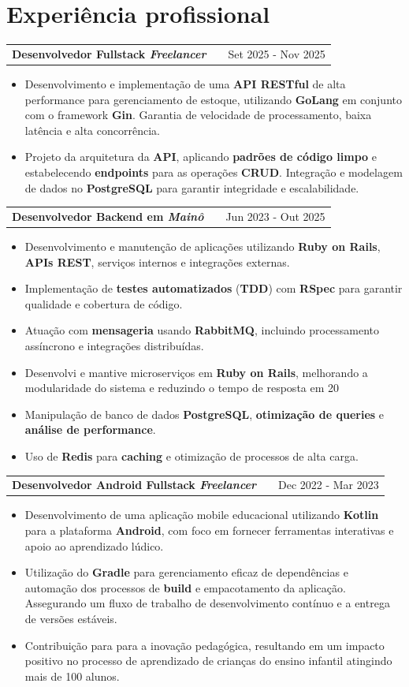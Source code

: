 \documentclass[a4paper,10.5pt]{article}
\makeatletter
\newenvironment{joblong}[2]
    {
    \begin{tabularx}{\linewidth}{@{}l X r@{}}
    \textbf{#1} & \hfill &  #2 \\[3.75pt]
    \end{tabularx}
    \begin{minipage}[t]{\linewidth}
    \begin{itemize}[nosep,after=\strut, leftmargin=1em, itemsep=3pt,label=--]
    }
    {
    \end{itemize}
    \end{minipage}    
    }
\makeatother
\begin{document}
\section{Experiência profissional}

\begin{joblong}{Desenvolvedor Fullstack \textit{Freelancer}}{Set 2025 - Nov 2025}
    \item Desenvolvimento e implementação de uma \textbf{API RESTful} de alta performance para gerenciamento de estoque, utilizando \textbf{GoLang} em conjunto com o framework \textbf{Gin}. Garantia de velocidade de processamento, baixa latência e alta concorrência.
    \item Projeto da arquitetura da \textbf{API}, aplicando \textbf{padrões de código limpo} e estabelecendo \textbf{endpoints} para as operações \textbf{CRUD}. Integração e modelagem de dados no \textbf{PostgreSQL} para garantir integridade e escalabilidade.
\end{joblong}

\begin{joblong}{Desenvolvedor Backend em \textit{Mainô}}{Jun 2023 - Out 2025}
    \item Desenvolvimento e manutenção de aplicações utilizando \textbf{Ruby on Rails}, \textbf{APIs REST}, serviços internos e integrações externas.
    \item Implementação de \textbf{testes automatizados} (\textbf{TDD}) com \textbf{RSpec} para garantir qualidade e cobertura de código.
    \item Atuação com \textbf{mensageria} usando \textbf{RabbitMQ}, incluindo processamento assíncrono e integrações distribuídas.
    \item Desenvolvi e mantive microserviços em \textbf{Ruby on Rails}, melhorando a modularidade do sistema e reduzindo o tempo de resposta em 20%
    \item Manipulação de banco de dados \textbf{PostgreSQL}, \textbf{otimização de queries} e \textbf{análise de performance}.
    \item Uso de \textbf{Redis} para \textbf{caching} e otimização de processos de alta carga.
\end{joblong}

\begin{joblong}{Desenvolvedor Android Fullstack \textit{Freelancer}}{Dec 2022 - Mar 2023}
    \item Desenvolvimento de uma aplicação mobile educacional utilizando \textbf{Kotlin} para a plataforma \textbf{Android}, com foco em fornecer ferramentas interativas e apoio ao aprendizado lúdico.
    \item Utilização do \textbf{Gradle} para gerenciamento eficaz de dependências e automação dos processos de \textbf{build} e empacotamento da aplicação. Assegurando um fluxo de trabalho de desenvolvimento contínuo e a entrega de versões estáveis.
    \item Contribuição para para a inovação pedagógica, resultando em um impacto positivo no processo de aprendizado de crianças do ensino infantil atingindo mais de 100 alunos.
\end{joblong}
\end{document}
